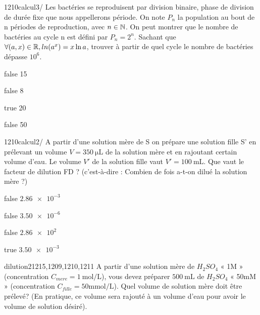 			\begin{question}{1210}{calcul}{3}{/}
				  Les bactéries se reproduisent par division binaire, phase de division de durée fixe que nous appellerons période. On note $P_n$ la population au bout de n périodes de reproduction, avec $n \in \mathbb {N}  $. On peut montrer que le nombre de bactéries au cycle n est défini par $P_n = 2^n$. Sachant que $\forall (a,x) \in \mathbb {R} , ln(a^x) = x\ln{a}$, trouver à partir de quel cycle le nombre de bactéries dépasse $10^6$. 
            \end{question}
            \begin{reponses}
            	\item[false] 15
            	\item[false] 8
                \item[true]  20
                \item[false] 50
            \end{reponses}
			\begin{question}{1210}{calcul}{2}{/}
				 A partir d’une solution mère de S on prépare une solution fille S' en prélevant un volume $V = \SI{350}{\micro\liter}$ de la solution mère et en rajoutant certain volume d’eau. Le volume $V'$ de la solution fille vaut $V' = \SI{100}{\milli\liter}$. Que vaut le facteur de dilution FD ? (c'est-à-dire : Combien de fois a-t-on dilué la solution mère ?) 
            \end{question}
            \begin{reponses}
            	\item[false]  $\SI{2.86e-3}{} $
            	\item[false]  $ \SI{3.50e-6}{}$
                \item[false]  $ \SI{2.86e2}{}$
                \item[true]   $ \SI{3.50e-3}{}$
            \end{reponses}
             \begin{question}{}{dilution}{2}{1215,1209,1210,1211}
				 A partir d’une solution mère de $H_2SO_4$ « 1M »  (concentration $C_{mere} = \SI{1} {\mole\per\liter}$), vous devez préparer $\SI{500}{\milli\liter}$ de $H_2SO_4$ « 50mM » (concentration $C_{fille} = 50 \si{\milli\mole\per\liter}$). Quel volume de solution mère doit être prélevé?  (En pratique, ce volume sera rajouté à un volume d'eau pour avoir le volume de solution désiré).
            \end{question}
